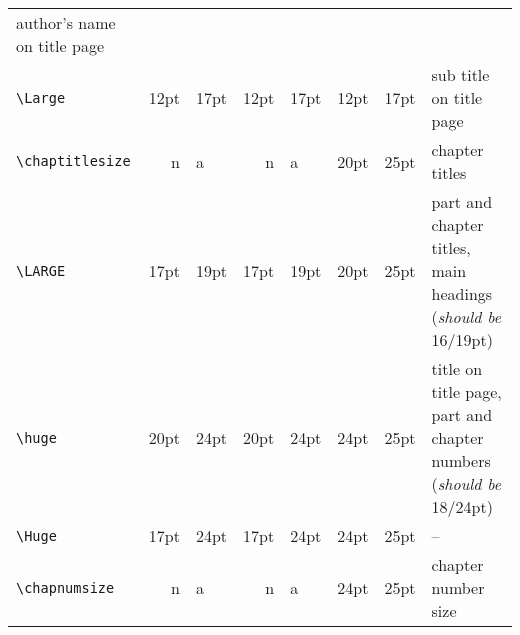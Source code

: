 \documentclass[cup6a]{cupbook}
\begin{document}
\begin{table*}[hbt]
\begin{tabular}{l|r@{/}lr@{/}lr@{/}lp{4cm}}
                   author's name on title page\\
 \verb"\Large"        & 12pt & 17pt & 12pt & 17pt & 12pt & 17pt & sub title
                   on title page\\
 \verb"\chaptitlesize"  
                      &  n   &  a   &  n   & a    & 20pt & 25pt &
                   chapter titles\\ 
 \verb"\LARGE"        & 17pt & 19pt & 17pt & 19pt & 20pt & 25pt & part and
                   chapter titles, main headings (\emph{should be} 16/19pt)\\
 \verb"\huge"         & 20pt & 24pt & 20pt & 24pt & 24pt & 25pt & title on
                   title page, part and chapter numbers (\emph{should be}
                   18/24pt)\\
 \verb"\Huge"         & 17pt & 24pt & 17pt & 24pt & 24pt & 25pt & -- \\
 \verb"\chapnumsize"  
                      &  n   &  a   &  n   & a    & 24pt & 25pt &
                   chapter number size\\ 
 \hline\hline
 \end{tabular}
\end{table*}
\end{document}
